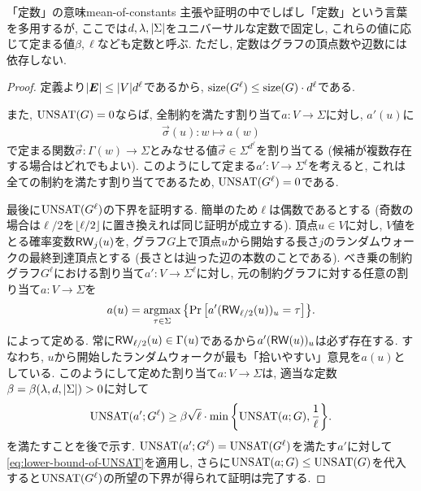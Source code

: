 \begin{remark}{「定数」の意味}{mean-of-constants}
  主張や証明の中でしばし「定数」という言葉を多用するが, ここでは$d,\lambda,\abs{\Sigma}$をユニバーサルな定数で固定し, これらの値に応じて定まる値$\beta,\ell$なども定数と呼ぶ.
  ただし, 定数はグラフの頂点数や辺数には依存しない.
\end{remark}

\begin{proof}

定義より$\abs{\boldsymbol{E}} \le \abs{V}d^{\ell}$であるから, $\mathrm{size}(G^\ell) \le \mathrm{size}(G)\cdot d^\ell$である.

また, $\mathrm{UNSAT}(G)=0$ならば, 全制約を満たす割り当て$a\colon V \to \Sigma$に対し, $a'(u)$に
\begin{align*}
  \vec{\sigma}(u)\colon w \mapsto a(w)
\end{align*}
で定まる関数$\vec{\sigma}\colon \Gamma(w)\to\Sigma$とみなせる値$\vec{\sigma}\in\Sigma^{d^\ell}$を割り当てる (候補が複数存在する場合はどれでもよい).
このようにして定まる$a'\colon V\to\Sigma^{\ell}$を考えると, これは全ての制約を満たす割り当てであるため, $\mathrm{UNSAT}(G^\ell)=0$である.

最後に$\mathrm{UNSAT}(G^\ell)$の下界を証明する.
簡単のため$\ell$は偶数であるとする (奇数の場合は$\ell/2$を$\lfloor\ell/2\rfloor$に置き換えれば同じ証明が成立する).
頂点$u\in V$に対し, $V$値をとる確率変数$\mathsf{RW}_j(u)$を, グラフ$G$上で頂点$u$から開始する長さ$j$のランダムウォークの最終到達頂点とする (長さとは辿った辺の本数のことである).
べき乗の制約グラフ$G^\ell$における割り当て$a'\colon V \to \Sigma^{\ell}$に対し, 元の制約グラフに対する任意の割り当て$a\colon V\to\Sigma$を
\begin{align}
  a(u) = \mathop{\mathrm{argmax}}_{\tau \in \Sigma} \qty{ \Pr\qty[ a'(\mathsf{RW}_{\ell/2}(u))_u = \tau ] }. \label{eq:argmax-of-RW}
\end{align}
によって定める.
常に$\mathsf{RW}_{\ell/2}(u)\in \Gamma(u)$であるから$a'(\mathsf{RW}(u))_u$は必ず存在する.
すなわち, $u$から開始したランダムウォークが最も「拾いやすい」意見を$a(u)$としている.
このようにして定めた割り当て$a\colon V \to \Sigma$は, 適当な定数$\beta=\beta(\lambda,d,\abs{\Sigma})>0$に対して
\begin{align}
  \mathrm{UNSAT}(a';G^\ell) \ge \beta\sqrt{\ell}\cdot \min\qty{ \mathrm{UNSAT}(a;G), \frac{1}{\ell} }. \label{eq:lower-bound-of-UNSAT}
\end{align}
を満たすことを後で示す. $\mathrm{UNSAT}(a';G^\ell)=\mathrm{UNSAT}(G^\ell)$を満たす$a'$に対して\cref{eq:lower-bound-of-UNSAT}を適用し, さらに$\mathrm{UNSAT}(a;G)\le \mathrm{UNSAT}(G)$を代入すると$\mathrm{UNSAT}(G^\ell)$の所望の下界が得られて証明は完了する.


\end{proof}
